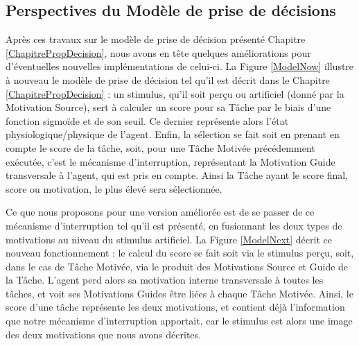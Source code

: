 	\subsection{Perspectives du Modèle de prise de décisions}
	Après ces travaux sur le modèle de prise de décision présenté Chapitre \ref{ChapitrePropDecision}, nous avons en tête quelques améliorations pour d'éventuelles nouvelles implémentations de celui-ci. La Figure \ref{ModelNow} illustre à nouveau le modèle de prise de décision tel qu'il est décrit dans le Chapitre  \ref{ChapitrePropDecision} : un stimulus, qu'il soit perçu ou artificiel (donné par la Motivation Source), sert à calculer un score pour sa Tâche par le biais d'une fonction sigmoïde et de son seuil. Ce dernier représente alors l'état physiologique/physique de l'agent. Enfin, la sélection se fait soit en prenant en compte le score de la tâche, soit, pour une Tâche Motivée précédemment exécutée, c'est le mécanisme d'interruption, représentant la Motivation Guide transversale à l'agent, qui est pris en compte. Ainsi la Tâche ayant le score final, score ou motivation, le plus élevé sera sélectionnée.
	
	Ce que nous proposons pour une version améliorée est de se passer de ce mécanisme d'interruption tel qu'il est présenté, en fusionnant les deux types de motivations au niveau du stimulus artificiel. La Figure \ref{ModelNext} décrit ce nouveau fonctionnement : le calcul du score se fait soit via le stimulus perçu, soit, dans le cas de Tâche Motivée, via le produit des Motivations Source et Guide de la Tâche. L'agent perd alors sa motivation interne transversale à toutes les tâches, et voit ses Motivations Guides être liées à chaque Tâche Motivée. Ainsi, le score d'une tâche représente les deux motivations, et contient déjà l'information que notre mécanisme d'interruption apportait, car le stimulus est alors une image des deux motivations que nous avons décrites.
	
